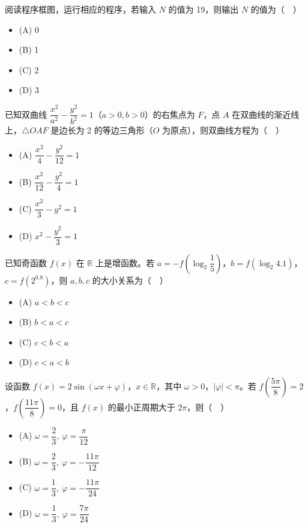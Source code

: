 \begin{question}
阅读程序框图，运行相应的程序，若输入 $N$ 的值为 19，则输出 $N$ 的值为（　）
\nopagebreak[4]
\begin{center}\end{center}
\nopagebreak[4]
\begin{itemize}
\item (A) 0
\item (B) 1
\item (C) 2
\item (D) 3
\end{itemize}

\end{question}
\begin{question}
已知双曲线 $\dfrac{x^2}{a^2}-\dfrac{y^2}{b^2}=1$（$a>0,b>0$）的右焦点为 $F$，点 $A$ 在双曲线的渐近线上，$\triangle OAF$ 是边长为 2 的等边三角形（$O$ 为原点），则双曲线方程为（　）

\begin{itemize}
\item (A) $\dfrac{x^2}{4}-\dfrac{y^2}{12}=1$
\item (B) $\dfrac{x^2}{12}-\dfrac{y^2}{4}=1$
\item (C) $\dfrac{x^2}{3}-y^2=1$
\item (D) $x^2-\dfrac{y^2}{3}=1$
\end{itemize}

\end{question}
\begin{question}
已知奇函数 $f(x)$ 在 $\mathbb R$ 上是增函数。若 $a=-f\left(\log_2\dfrac15\right)$，$b=f(\log_2 4.1)$，$c=f(2^{0.8})$，则 $a,b,c$ 的大小关系为（　）

\begin{itemize}
\item (A) $a<b<c$
\item (B) $b<a<c$
\item (C) $c<b<a$
\item (D) $c<a<b$
\end{itemize}

\end{question}
\begin{question}
设函数 $f(x)=2\sin(\omega x+\varphi)$，$x\in\mathbb R$，其中 $\omega>0$，$|\varphi|<\pi$。若 $f\left(\dfrac{5\pi}{8}\right)=2$，$f\left(\dfrac{11\pi}{8}\right)=0$，且 $f(x)$ 的最小正周期大于 $2\pi$，则（　）

\begin{itemize}
\item (A) $\omega=\dfrac23,\ \varphi=\dfrac{\pi}{12}$
\item (B) $\omega=\dfrac23,\ \varphi=-\dfrac{11\pi}{12}$
\item (C) $\omega=\dfrac13,\ \varphi=-\dfrac{11\pi}{24}$
\item (D) $\omega=\dfrac13,\ \varphi=\dfrac{7\pi}{24}$
\end{itemize}

\end{question}
